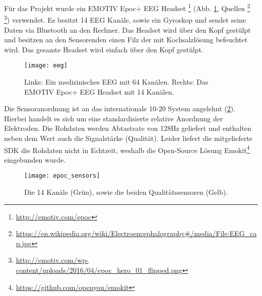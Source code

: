\label{chap:eeg}
Für das Projekt wurde ein EMOTIV Epoc+ EEG Headset \footnote{\url{http://emotiv.com/epoc}} (Abb. \ref{fig:eeg}, Quellen \footnote{\url{https://en.wikipedia.org/wiki/Electroencephalography\#/media/File:EEG_cap.jpg}} \footnote{\url{http://emotiv.com/wp-content/uploads/2016/04/epoc_hero_01_flipped.png}}) verwendet. Es besitzt 14 EEG Kanäle, sowie ein Gyroskop und sendet seine Daten via Bluetooth an den Rechner. Das Headset wird über den Kopf gestülpt und besitzen an den Sensorenden einen Filz der mit Kochsalzlösung befeuchtet wird. Das gesamte Headset wird einfach über den Kopf gestülpt.

\begin{figure}[h] 
  \begin{center}
    \texttt{[image: eeg]}
    \caption[Medzinisches EEG / EMOTIV Epoc+]{Links: Ein medizinisches EEG mit 64 Kanälen. Rechts: Das EMOTIV Epoc+ EEG Headset mit 14 Kanälen.\label{fig:eeg}}
  \end{center}
\end{figure}

Die Sensoranordnung ist an das internationale 10-20 System \cite{10-20}  angelehnt (\ref{fig:epoc_sensors}). Hierbei handelt es sich um eine standardisierte relative Anordnung der Elektroden. Die Rohdaten werden Abtastrate von 128Hz geliefert und enthalten neben dem Wert auch die Signalstärke (Qualität). Leider liefert die mitgelieferte SDK die Rohdaten nicht in Echtzeit, weshalb die Open-Source Lösung Emokit\footnote{\url{https://github.com/openyou/emokit}} eingebunden wurde.

\begin{figure}[h] 
  \begin{center}
    \texttt{[image: epoc\_sensors]}
    \caption[EEG Sensoranordnung]{Die 14 Kanäle (Grün), sowie die beiden Qualitätssensoren (Gelb).\label{fig:epoc_sensors}}
  \end{center}
\end{figure}